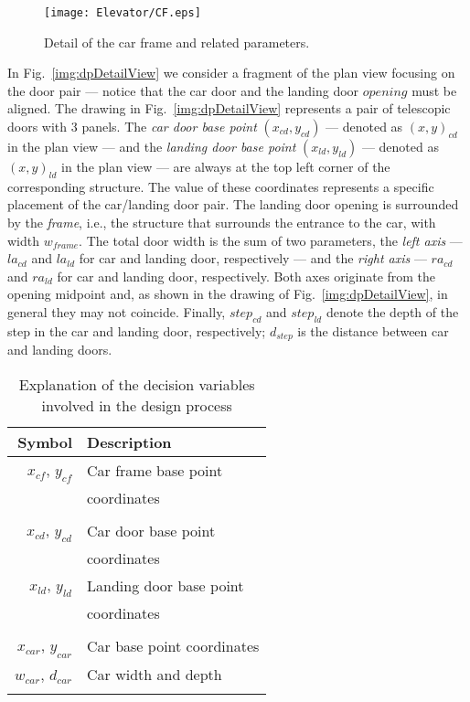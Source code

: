 \begin{wrapfigure}{l}{.45\textwidth}
	\caption{\label{img:cfDetailView} Detail of the car frame and
		related parameters.}
	\texttt{[image: Elevator/CF.eps]}
\end{wrapfigure}

In Fig.~\ref{img:dpDetailView} we consider a fragment of the
plan view focusing on the door pair --- notice that the car door and
the landing door $opening$ must be aligned. The drawing in 
Fig.~\ref{img:dpDetailView} represents a pair of telescopic
doors with 3 panels. The \emph{car door base point} $(x_{cd}, y_{cd})$
--- denoted as $(x,y)_{cd}$ in the plan view --- and the 
\emph{landing door base point} $(x_{ld}, y_{ld})$ --- denoted as 
$(x,y)_{ld}$ in the plan view --- are always at the top left corner 
of the corresponding structure.
The value of these coordinates represents a specific placement of the 
car/landing door pair. The landing door opening is surrounded by the 
\emph{frame}, i.e., the structure that surrounds the entrance to the 
car, with width $w_{frame}$. The total door width is the sum of two
parameters, the \emph{left axis} --- $la_{cd}$ and $la_{ld}$ for car
and landing door, respectively --- and the \emph{right axis} ---
$ra_{cd}$ and $ra_{ld}$ for car and landing door, respectively. Both
axes originate from the opening midpoint and, as shown in the drawing
of Fig.~\ref{img:dpDetailView}, in general they may not
coincide. Finally, $step_{cd}$ and $step_{ld}$ denote the depth of the
step in the car and landing door, respectively; $d_{step}$ is the
distance between car and landing doors.

\begin{table}[t]
	\setlength{\tabcolsep}{20pt}
	\caption{\label{tab:variables} Explanation of the decision variables 
		involved in the design process} 
	\centering
	\begin{tabular}{rl}
		\toprule
		\textbf{Symbol} & \textbf{Description} \\
		\midrule
		$x_{cf}$, $y_{cf}$ 		& Car frame base point \\
		& coordinates \\
		& \\
		$x_{cd}$, $y_{cd}$ 		& Car door base point \\
		& coordinates \\
		$x_{ld}$, $y_{ld}$ 		& Landing door base point \\
		& coordinates \\
		& \\
		$x_{car}$, $y_{car}$ 	& Car base point coordinates \\
		$w_{car}$, $d_{car}$ 	& Car width and depth \\
		& \\
		\bottomrule
	\end{tabular}
\end{table}

